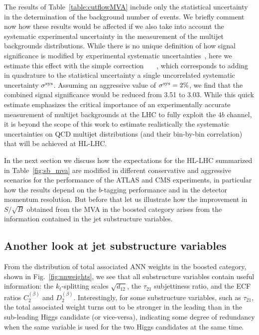 The results of Table~\ref{table:cutflowMVA} include
only the statistical uncertainty in the determination of
the background number of events.
%
We  briefly comment now how these results would be affected
if we also take into account the systematic experimental
uncertainty in the measurement
of the multijet backgrounds distributions.
%
While there is no unique definition of how signal significance is modified
by experimental systematic uncertainties~\cite{Bityukov:2002eq}, here we estimate
this effect with the simple correction
\be
{} \, \to \,   \, ,
\ee
which corresponds to adding in quadrature to the statistical uncertainty  a single
uncorrelated systematic uncertainty $\sigma^{\rm sys}$.
%
Assuming an aggressive value of $\sigma^{\rm sys}=2\%$,
we find that the combined signal significance would be
reduced from 3.51 to 3.03.
%
While this quick estimate emphasizes the critical
importance of an experimentally accurate
measurement of multijet backgrounds at the LHC to fully exploit the $4b$
channel,
it is beyond the scope of this work to estimate realistically
the systematic uncertainties on QCD multijet distributions (and their bin-by-bin correlation)
that will be achieved at HL-LHC.


In the next section we discuss how the expectations for the HL-LHC
summarized in  Table~\ref{fig:sb_mva} are modified in different
conservative and aggressive scenarios for the performance of the
ATLAS and CMS experiments, in particular how the results depend
on the $b$-tagging performance and in the detector momentum
resolution.
%
But before that let us illustrate how the improvement in $S/\sqrt{B}$
obtained from the MVA in the boosted
category arises from the information contained in the
jet substructure variables.

\subsection{Another look at jet substructure variables}

%
From the distribution of total associated ANN weights in the
boosted category, shown in Fig.~\ref{fig:nnweights}, we see that
all substructure variables contain useful information:
the $k_t$-splitting scales $\sqrt{d_{12}}$,
the $\tau_{21}$ subjettiness ratio, and the ECF ratios
$C_2^{(\beta)}$ and $D_2^{(\beta)}$.
%
Interestingly, for some substructure variables, such as $\tau_{21}$,
the total associated weight turns out to be stronger in the leading
than in the sub-leading Higgs candidate (or vice-versa), indicating some
degree of redundancy when the same variable is used for the two Higgs candidates
at the same time.



